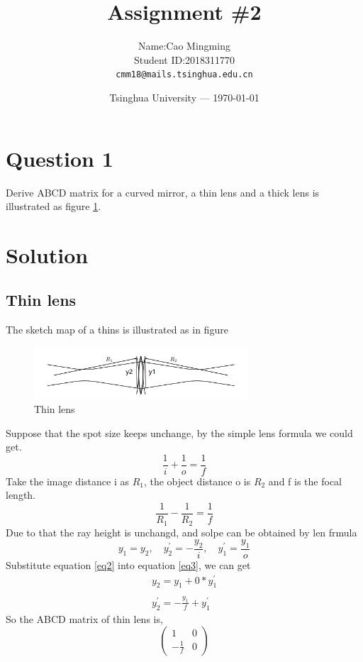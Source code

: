 \documentclass{article}
\title{Assignment \#2} %
\author{Name:Cao Mingming\\ Student ID:2018311770\\ \texttt{cmm18@mails.tsinghua.edu.cn}} %
\date{Tsinghua University --- \today} %
\begin{document}
\maketitle %

\section{Question 1}
Derive ABCD matrix for a curved mirror, a thin lens and a thick lens is illustrated as figure \ref{fig1}.
\section*{Solution}
\subsection{Thin lens}
The sketch map of a thins is illustrated as in figure 
\begin{figure}[h]
	\centering
	\includegraphics[width=8cm]{thin_lens.png}
	\caption{Thin lens}
	\label{fig1}
\end{figure}
Suppose that the spot size keeps unchange, by the simple lens formula we could get.
\begin{equation}\label{eq1}
\frac{1}{i}+\frac{1}{o}=\frac{1}{f}
\end{equation}
Take the image distance i as $ R_1 $, the object distance o is $ R_2 $ and f is the focal length.
\begin{equation}\label{eq2}
\frac{1}{R_1}-\frac{1}{R_2}=\frac{1}{f}
\end{equation}
Due to that the ray height is unchangd, and solpe can be obtained by len frmula
\begin{equation}\label{eq3}
y_1=y_2,\quad y_{2}^{'}=-\frac{y_2}{i},\quad y_{1}^{'}=\frac{y_1}{o}
\end{equation}
Substitute equation \ref{eq2} into equation \ref{eq3}, we can get
\begin{equation}\label{key}
\begin{array}{l}
y_2=y_1+0*y_{1}^{'}\\
\\
y_{2}^{'}=-\frac{y_1}{f}+y_{1}^{'}
\end{array}
\end{equation}
So the ABCD matrix of thin lens is,
\begin{equation}\label{eq5}
\left(
\begin{array}{cc}
1 & 0\\
-\frac{1}{f} & 0
\end{array}
\right)
\end{equation}
\end{document}
